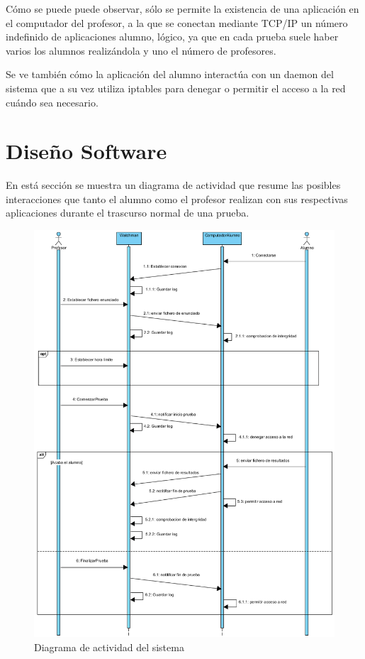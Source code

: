Cómo se puede puede observar, sólo se permite la existencia de una aplicación en el computador del profesor, a la que se conectan mediante TCP/IP un número indefinido de aplicaciones alumno, lógico, ya que en cada prueba suele haber varios los alumnos realizándola y uno el número de profesores.
\newline

Se ve también cómo la aplicación del alumno interactúa con un daemon del sistema que a su vez utiliza iptables para denegar o permitir el acceso a la red cuándo sea necesario.


\section{Diseño Software}
\label{sec:arquitectura:diseno}

En está sección se muestra un diagrama de actividad que resume las posibles interacciones que tanto el alumno como el profesor realizan con sus respectivas aplicaciones durante el trascurso normal de una prueba.
\newline

\begin{figure}
    \centering
    \includegraphics[width=12cm]{arquitectura/actividadSistema}
    \caption{Diagrama de actividad del sistema}
    \label{fig:arquitectura:actividadSistema}
\end{figure}


